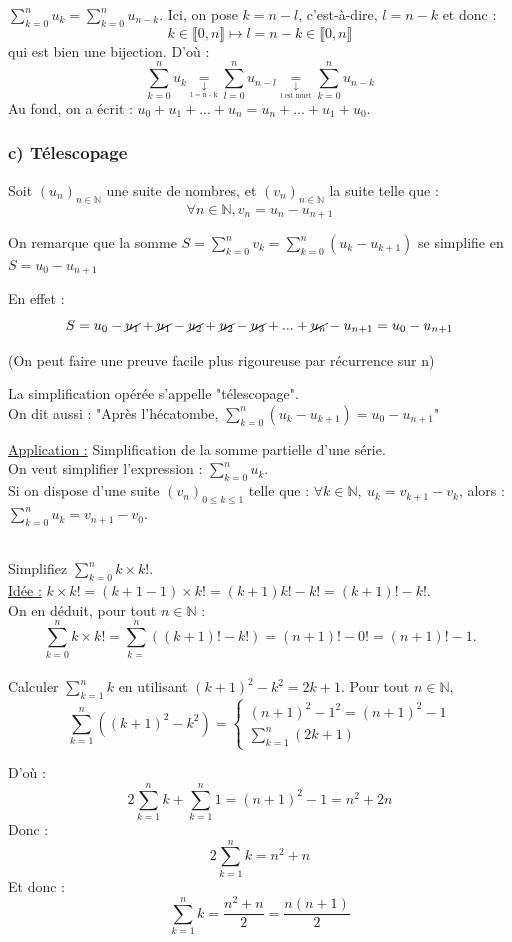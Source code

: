 \documentclass[a4paper,11pt]{article}
\newcommand{\N}{\mathbb{N}}
\newcommand{\intN}[2]{\llbracket #1, #2 \rrbracket}
\newcommand{\encadLEQ}[3]{#1 \leq #2 \leq #3}
\newcommand{\famille}[2]{(#1)_{#2}}
\newcommand{\equalwithtext}[1]{\underset{\underset{\text{#1}}{\downarrow}}{=}}
\begin{document}
\begin{exemples}
	$\sum_{k=0}^{n}u_k = \sum_{k=0}^{n}u_{n-k}$.
	Ici, on pose $k = n - l$, c'est-à-dire, $l = n - k$ et donc : $$k\in\intN{0}{n} \longmapsto l = n - k \in\intN{0}{n}$$
	qui est bien une bijection. D'où : $$\sum_{k=0}^{n}u_k \equalwithtext{l = n - k} \sum_{l=0}^{n}u_{n-l} \equalwithtext{l est muet} \sum_{k=0}^{n}u_{n-k}$$
	Au fond, on a écrit : $u_0 + u_1 + ... + u_n = u_n + ... + u_1 + u_0$.
\end{exemples}

\subsubsection*{c) Télescopage}
Soit $\famille{u_n}{n\in\N}$ une suite de nombres, et $\famille{v_n}{n\in\N}$ la suite telle que : 
$$\forall n \in\N, v_n = u_n - u_{n+1}$$

On remarque que la somme $S = \sum_{k=0}^{n}v_k = \sum_{k=0}^{n}(u_k - u_{k+1})$ se simplifie en $S = u_0 - u_{n+1}$

En effet :
$$S = u_0 - \cancel{u_1} + \cancel{u_1} - \cancel{u_2} + \cancel{u_2} - \cancel{u_3} + ... + \cancel{u_n} - u_{n+1} = u_0 - u_{n+1}$$

(On peut faire une preuve facile plus rigoureuse par récurrence sur n)
\medskip

La simplification opérée s'appelle "télescopage". \\
On dit aussi : "Après l'hécatombe, $\sum_{k=0}^{n}(u_k - u_{k+1}) = u_0 - u_{n+1}$"

\medskip

\textcolor{bordeaux}{\underline{Application :}} Simplification de la somme partielle d'une série.\\
On veut simplifier l'expression : $\sum_{k=0}^{n}u_k$.\\
Si on dispose d'une suite $\famille{v_n}{\encadLEQ{0}{k}{1}}$
telle que : $\forall k\in\N, \: u_k = v_{k+1} - v_k$,
alors : $\sum_{k=0}^{n}u_k = v_{n+1} - v_0$.

\begin{exemples}
	\\
	Simplifiez $\sum_{k=0}^{n}k\times k!$.\\
	\underline{Idée :} $k\times k! = (k + 1 - 1)\times k! = (k+1)k! - k! = (k+1)! - k!$.\\
	On en déduit, pour tout $n\in\N$ : $$\sum_{k=0}^{n}k\times k! = \sum_{k=}^{n}((k+1)! - k!) = (n+1)! - 0! = (n+1)! - 1.$$\\
	
	Calculer $\sum_{k=1}^{n}k$ en utilisant $(k+1)^2 - k^2 = 2k + 1$.
	Pour tout $n\in\N$,$$\sum_{k=1}^{n}((k+1)^2 - k^2) = 
	\begin{cases}
		(n+1)^2 - 1^2 = (n+1)^2 - 1\\
		\sum_{k=1}^{n}(2k + 1)
	\end{cases}$$
	
	D'où : $$2\sum_{k=1}^{n}k + \sum_{k=1}^{n}1 = (n+1)^2 - 1 = n^2 +2n$$
	Donc : $$2\sum_{k=1}^{n}k = n^2 + n$$
	Et donc : $$\sum_{k=1}^{n}k = \dfrac{n^2 + n}{2} = \dfrac{n(n+1)}{2}$$
\end{exemples}
\end{document}
